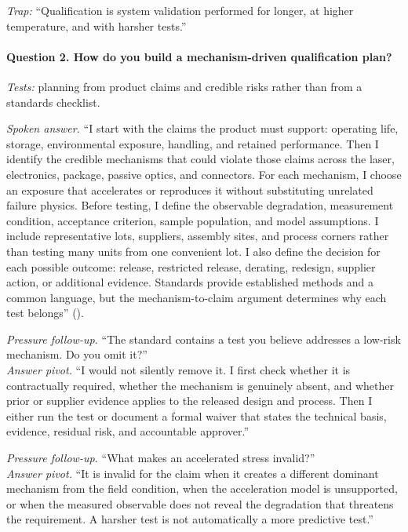 \textit{Trap:} ``Qualification is system validation performed for longer, at
higher temperature, and with harsher tests.''

\paragraph{Question 2. How do you build a mechanism-driven qualification plan?}
\textit{Tests:} planning from product claims and credible risks rather than from
a standards checklist.

\textit{Spoken answer.}
``I start with the claims the product must support: operating life, storage,
environmental exposure, handling, and retained performance. Then I identify the
credible mechanisms that could violate those claims across the laser,
electronics, package, passive optics, and connectors. For each mechanism, I
choose an exposure that accelerates or reproduces it without substituting
unrelated failure physics. Before testing, I define the observable degradation,
measurement condition, acceptance criterion, sample population, and model
assumptions. I include representative lots, suppliers, assembly sites, and
process corners rather than testing many units from one convenient lot. I also
define the decision for each possible outcome: release, restricted release,
derating, redesign, supplier action, or additional evidence. Standards provide
established methods and a common language, but the mechanism-to-claim argument
determines why each test belongs''
().

\textit{Pressure follow-up.} ``The standard contains a test you believe addresses
a low-risk mechanism. Do you omit it?''\\
\textit{Answer pivot.} ``I would not silently remove it. I first check whether
it is contractually required, whether the mechanism is genuinely absent, and
whether prior or supplier evidence applies to the released design and process.
Then I either run the test or document a formal waiver that states the technical
basis, evidence, residual risk, and accountable approver.''

\textit{Pressure follow-up.} ``What makes an accelerated stress invalid?''\\
\textit{Answer pivot.} ``It is invalid for the claim when it creates a different
dominant mechanism from the field condition, when the acceleration model is
unsupported, or when the measured observable does not reveal the degradation
that threatens the requirement. A harsher test is not automatically a more
predictive test.''

